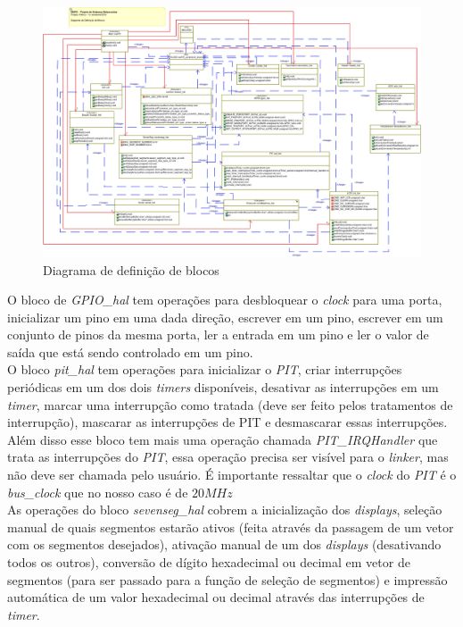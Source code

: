 \documentclass{article}
\begin{document}
\begin{figure}[H]
	\centering
	\includegraphics[width=1.5\linewidth, center]{blocos}
	\caption{Diagrama de definição de blocos}
	\label{fig:blocos}
\end{figure}

O bloco de \textit{GPIO\_hal} tem operações para desbloquear o \textit{clock} para uma porta, inicializar um pino em uma dada direção, escrever em um pino, escrever em um conjunto de pinos da mesma porta, ler a entrada em um pino e ler o valor de saída que está sendo controlado em um pino.\\

O bloco \textit{pit\_hal} tem operações para inicializar o \textit{PIT}, criar interrupções periódicas em um dos dois \textit{timers} disponíveis, desativar as interrupções em um \textit{timer}, marcar uma interrupção como tratada (deve ser feito pelos tratamentos de interrupção), mascarar as interrupções de PIT e desmascarar essas interrupções. Além disso esse bloco tem mais uma operação chamada \textit{PIT\_IRQHandler }que trata as interrupções do \textit{PIT}, essa operação precisa ser visível para o \textit{linker}, mas não deve ser chamada pelo usuário. É importante ressaltar que o \textit{clock} do \textit{PIT} é o \textit{bus\_clock} que no nosso caso é de $20MHz$\\

As operações do bloco \textit{sevenseg\_hal} cobrem a inicialização dos \textit{displays}, seleção manual de quais segmentos estarão ativos (feita através da passagem de um vetor com os segmentos desejados), ativação manual de um dos \textit{displays} (desativando todos os outros), conversão de dígito hexadecimal ou decimal em vetor de segmentos (para ser passado para a função de seleção de segmentos) e impressão automática de um valor hexadecimal ou decimal através das interrupções de \textit{timer}.\\
\end{document}
